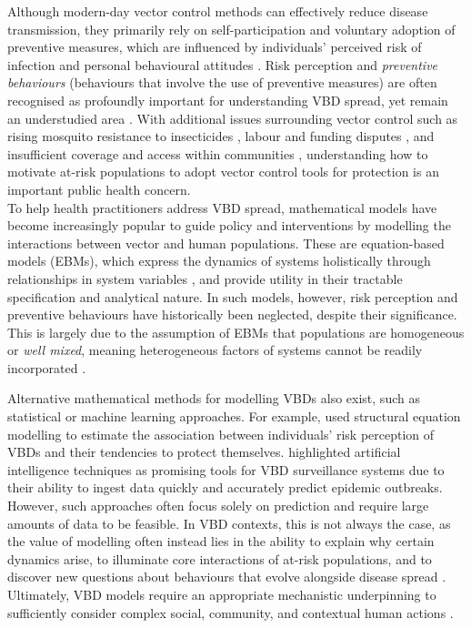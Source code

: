 Although modern-day vector control methods can effectively reduce disease transmission, they primarily rely on self-participation and voluntary adoption of preventive measures, which are influenced by individuals' perceived risk of infection and personal behavioural attitudes \cite{winch_effectiveness_1992, brewer_risk_2004, raude_public_2012, lopes-rafegas_contribution_2023}. Risk perception and \textit{preventive behaviours} (behaviours that involve the use of preventive measures) are often recognised as profoundly important for understanding VBD spread, yet remain an understudied area \cite{williams_role_2010}. With additional issues surrounding vector control such as rising mosquito resistance to insecticides \cite{chala_emerging_2021, hemingway_averting_2016}, labour and funding disputes \cite{winch_effectiveness_1992}, and insufficient coverage and access within communities \cite{okumu_what_2022}, understanding how to motivate at-risk populations to adopt vector control tools for protection is an important public health concern. \\

To help health practitioners address VBD spread, mathematical models have become increasingly popular to guide policy and interventions by modelling the interactions between vector and human populations. These are equation-based models (EBMs), which express the dynamics of systems holistically through relationships in system variables \cite{van_dyke_parunak_agent-based_1998}, and provide utility in their tractable specification and analytical nature. In such models, however, risk perception and preventive behaviours have historically been neglected, despite their significance. This is largely due to the assumption of EBMs that populations are homogeneous or \textit{well mixed}, meaning heterogeneous factors of systems cannot be readily incorporated \cite{perkins_heterogeneity_2013, hunter_comparison_2018}.

Alternative mathematical methods for modelling VBDs also exist, such as statistical or machine learning approaches. For example, \citet{aerts_understanding_2020} used structural equation modelling to estimate the association between individuals' risk perception of VBDs and their tendencies to protect themselves. \citet{pley_digital_2021} highlighted artificial intelligence techniques as promising tools for VBD surveillance systems due to their ability to ingest data quickly and accurately predict epidemic outbreaks. However, such approaches often focus solely on prediction and require large amounts of data to be feasible. In VBD contexts, this is not always the case, as the value of modelling often instead lies in the ability to explain why certain dynamics arise, to illuminate core interactions of at-risk populations, and to discover new questions about behaviours that evolve alongside disease spread \cite{epstein_why_2008, bruch_agent-based_2015}. Ultimately, VBD models require an appropriate mechanistic underpinning to sufficiently consider complex social, community, and contextual human actions \cite{funk_modelling_2010, bedson_review_2021}.

